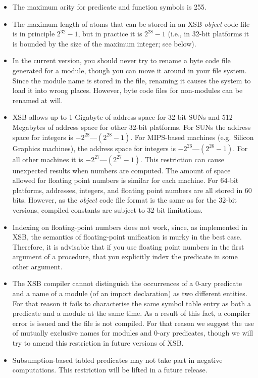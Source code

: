 \begin{itemize}
\item The maximum arity for predicate and function symbols is 255.
%
\item The maximum length of atoms that can be stored in an XSB
      \emph{object} code file is in principle $2^{32}-1$, but in
      practice it is $2^{28}-1$ (i.e., in 32-bit platforms it is
      bounded by the size of the maximum integer; see below).
%
\item In the current version, you should never try to rename a byte code 
      file generated for a module, though you can move it around in your 
      file system.  Since the module name is stored in the file, renaming it
      causes the system to load it into wrong places.  However, byte code 
      files for non-modules can be renamed at will.
%
\item XSB allows up to 1 Gigabyte of address space for 32-bit SUNs and 512
      Megabytes of address space for other 32-bit platforms.  For SUNs the
      address space for integers is $-2^{28}$---$(2^{28}-1)$.  For
      MIPS-based machines (e.g. Silicon Graphics machines), the
      address space for integers is $-2^{26}$---$(2^{26}-1)$.  For all
      other machines it is $-2^{27}$---$(2^{27}-1)$.  This restriction can
      cause unexpected results when numbers are computed.  The amount
      of space allowed for floating point numbers is similar for each
      machine.  For 64-bit platforms, addresses, integers, and
      floating point numbers are all stored in 60 bits. However, as the
      \emph{object} code file format is the same as for the 32-bit versions,
      compiled constants are subject to 32-bit limitations.
%
\item	Indexing on floating-point numbers does not work, since, as
implemented in XSB, the semantics
      of floating-point unification is murky in the best case. Therefore, it
      is advisable that if you use floating point numbers in the first 
      argument of a procedure,  that you explicitly index the
      predicate in some other argument.
%
\item	The XSB compiler cannot distinguish the occurrences of a
      0-ary predicate and a name of a module (of an import declaration) as
      two different entities.  For that reason it fails to characterise the
      same symbol table entry as both a predicate and a module at the
      same time.  As a result of this fact, a compiler error is issued
      and the file is not compiled.  For that reason we suggest the
      use of mutually exclusive names for modules and 0-ary predicates,
      though we will try to amend this restriction in future versions of
      XSB.
%
\item Subsumption-based tabled predicates may not take part in
      negative computations.  This restriction will be lifted in a
      future release.
\end{itemize}


